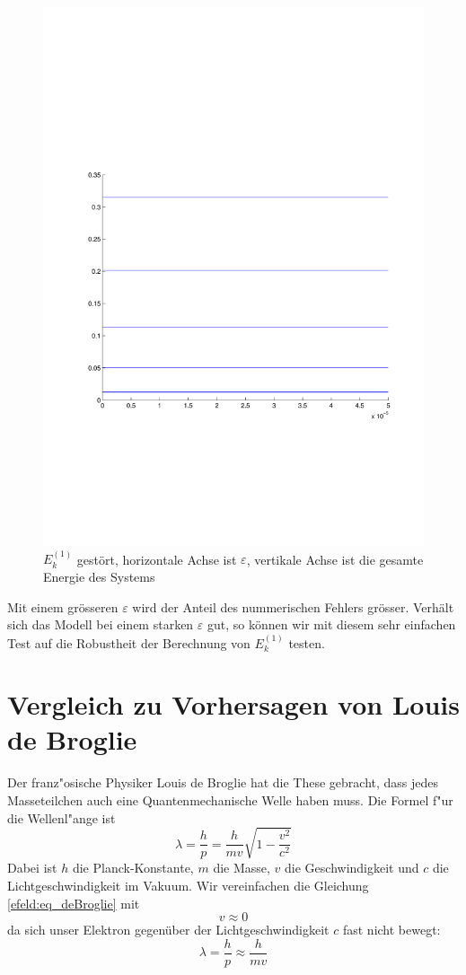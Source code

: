 \begin{refsection}
\begin{figure}
 \centering
 \includegraphics[width=12cm,clip=true,trim=2cm 7cm 1cm 8cm]{efeld/Energie_gestoert.pdf}
 \caption{$E_k^{(1)}$ gest\"ort, horizontale Achse ist $\varepsilon$, vertikale Achse ist die gesamte Energie des Systems}
 \label{abb:efeld_E_gestoert}
\end{figure}

Mit einem gr\"osseren $\varepsilon$ wird der Anteil des nummerischen Fehlers gr\"osser.
Verh\"alt sich das Modell bei einem starken $\varepsilon$ gut, so k\"onnen wir mit diesem sehr einfachen Test
auf die Robustheit der Berechnung von $E_k^{(1)}$ testen.


\section{Vergleich zu Vorhersagen von Louis de Broglie}
Der franz"osische Physiker Louis de Broglie hat die These gebracht,
dass jedes Masseteilchen auch eine Quantenmechanische Welle haben muss.
Die Formel f"ur die Wellenl"ange ist
\begin{equation}
  \label{efeld:eq_deBroglie}
  \lambda = \frac{h}{p} = \frac {h}{{m}{v}} \sqrt{1 - \frac{v^2}{c^2}}
\end{equation}
Dabei ist $h$ die Planck-Konstante, $m$ die Masse, $v$ die Geschwindigkeit
und $c$ die Lichtgeschwindigkeit im Vakuum.
Wir vereinfachen die Gleichung \ref{efeld:eq_deBroglie} mit
\[
  v \approx 0
\]
da sich unser Elektron gegen\"uber der Lichtgeschwindigkeit $c$ fast nicht bewegt:
\begin{equation}
  \lambda = \frac{h}{p} \approx \frac{h}{m v}
\end{equation}


\end{refsection}

